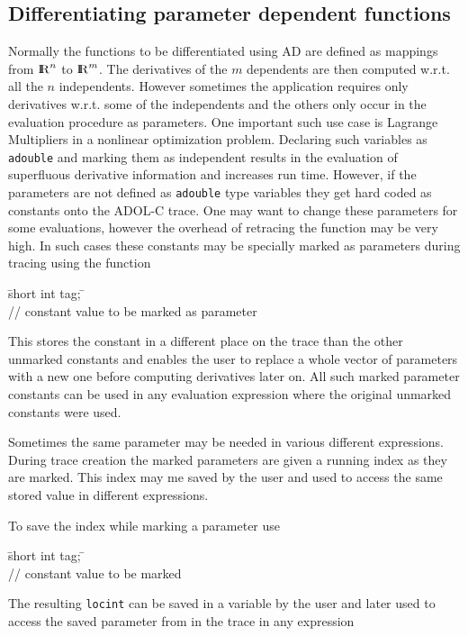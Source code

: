 \documentclass[11pt,twoside]{article}
\newcommand{\R}{{ {\rm I} \kern -.225em {\rm R} }}
\begin{document}
\subsection{Differentiating parameter dependent functions}
%
Normally the functions to be differentiated using AD are defined as
mappings from $\R^n$ to $\R^m$. The derivatives of the $m$ dependents
are then computed w.r.t. all the $n$ independents. However sometimes
the application requires only derivatives w.r.t. some of the
independents and the others only occur in the evaluation procedure as
parameters. One important such use case is Lagrange Multipliers in a
nonlinear optimization problem. Declaring such variables as
\verb=adouble= and marking them as independent results in the
evaluation of superfluous derivative information and increases
run time. However, if the parameters are not defined as \verb=adouble=
type variables they get hard coded as constants onto the ADOL-C
trace. One may want to change these parameters for some evaluations,
however the overhead of retracing the function may be very high. In
such cases these constants may be specially marked as parameters
during tracing using the function 
\begin{tabbing}
\hspace{0.5in}\={\sf short int tag;} \hspace{1.1in}\= \kill    %
\\
         \> // constant value to be marked as parameter \\
\end{tabbing}
This stores the constant in a different place on the trace than the
other unmarked constants and enables the user to replace a whole
vector of parameters with a new one before computing derivatives later
on. All such marked parameter constants can be used in any evaluation
expression where the original unmarked constants were used.

Sometimes the same parameter may be needed in various different
expressions. During trace creation the marked parameters are given a
running index as they are marked. This index may me saved by the user
and used to access the same stored value in different expressions.

To save the index while marking a parameter use
\begin{tabbing}
\hspace{0.5in}\={\sf short int tag;} \hspace{1.1in}\= \kill    %
\\
 \> // constant value to be marked
\end{tabbing}
The resulting \verb=locint= can be saved in a variable by the user and
later used to access the saved parameter from in the trace in any expression
\end{document}
